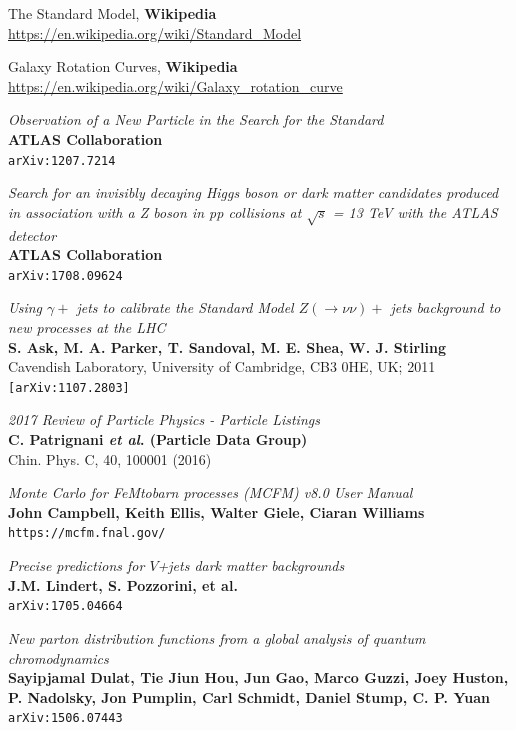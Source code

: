 \documentclass[11pt,a4paper]{report}
\begin{document}
\begin{thebibliography}{9}
	The Standard Model, \textbf{Wikipedia}\\ \url{https://en.wikipedia.org/wiki/Standard_Model}

	Galaxy Rotation Curves, \textbf{Wikipedia}\\ \url{https://en.wikipedia.org/wiki/Galaxy_rotation_curve}	

	\textit{Observation of a New Particle in the Search for the Standard}\\
	\textbf{ATLAS Collaboration}\\
	\texttt{arXiv:1207.7214}

	\textit{Search for an invisibly decaying Higgs boson or dark matter candidates produced in association with a Z boson in pp collisions at $\sqrt{s}$ = 13 TeV with the ATLAS detector}\\
	\textbf{ATLAS Collaboration}\\
	\texttt{arXiv:1708.09624}
	
	\textit{Using $\gamma +$ jets to calibrate the Standard Model $Z(\rightarrow \nu\nu)+$ jets background to new processes at the LHC}\\
	\textbf{S. Ask, M. A. Parker, T. Sandoval, M. E. Shea, W. J. Stirling}\\
Cavendish Laboratory, University of Cambridge, CB3 0HE, UK; 2011\\
	\texttt{[arXiv:1107.2803]}

	\textit{2017 Review of Particle Physics - Particle Listings}\\
	\textbf{C. Patrignani \textit{et al}. (Particle Data Group)}\\
	Chin. Phys. C, 40, 100001 (2016)
	
	\textit{Monte Carlo for FeMtobarn processes (MCFM) v8.0 User Manual}\\
	\textbf{John Campbell, Keith Ellis, Walter Giele, Ciaran Williams}\\
	\texttt{https://mcfm.fnal.gov/}
	
	\textit{Precise predictions for $V$+jets dark matter backgrounds}\\
	\textbf{J.M. Lindert, S. Pozzorini, et al.}\\
	\texttt{arXiv:1705.04664}
	
	\textit{New parton distribution functions from a global analysis of quantum chromodynamics}\\
	\textbf{Sayipjamal Dulat, Tie Jiun Hou, Jun Gao, Marco Guzzi, Joey Huston, P. Nadolsky, Jon Pumplin, Carl Schmidt, Daniel Stump, C. P. Yuan}\\
	\texttt{arXiv:1506.07443}


\end{thebibliography}
\end{document}
